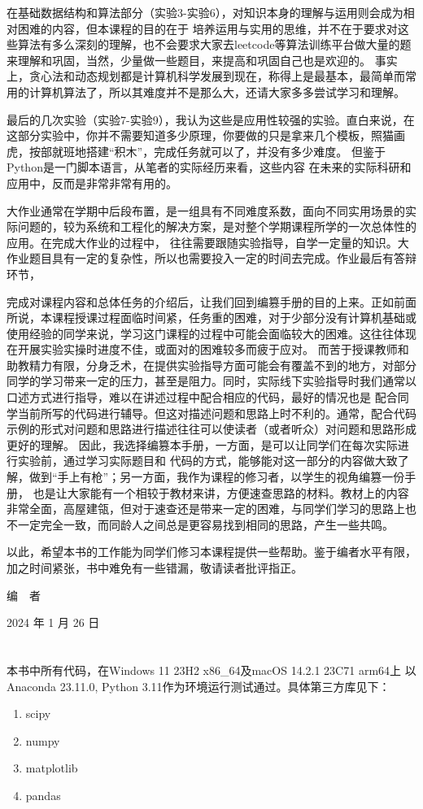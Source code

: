 \documentclass[UTF8,a5paper,10pt]{ctexbook}
\makeatletter
\renewcommand\tableofcontents{%
    \thispagestyle{empty}
    \section*{\contentsname
        \@mkboth{%
           \MakeUppercase\contentsname}{\MakeUppercase\contentsname}}%
    \@starttoc{toc}%
    \newpage
    }
\makeatother
\begin{document}
在基础数据结构和算法部分（实验3-实验6），对知识本身的理解与运用则会成为相对困难的内容，但本课程的目的在于
培养运用与实用的思维，并不在于要求对这些算法有多么深刻的理解，也不会要求大家去leetcode等算法训练平台做大量的题来理解和巩固，当然，少量做一些题目，来提高和巩固自己也是欢迎的。
事实上，贪心法和动态规划都是计算机科学发展到现在，称得上是最基本，最简单而常用的计算机算法了，所以其难度并不是那么大，还请大家多多尝试学习和理解。

最后的几次实验（实验7-实验9），我认为这些是应用性较强的实验。直白来说，在这部分实验中，你并不需要知道多少原理，你要做的只是拿来几个模板，照猫画虎，按部就班地搭建“积木”，完成任务就可以了，并没有多少难度。
但鉴于Python是一门脚本语言，从笔者的实际经历来看，这些内容
在未来的实际科研和应用中，反而是非常非常有用的。

大作业通常在学期中后段布置，是一组具有不同难度系数，面向不同实用场景的实际问题的，较为系统和工程化的解决方案，是对整个学期课程所学的一次总体性的应用。在完成大作业的过程中，
往往需要跟随实验指导，自学一定量的知识。大作业题目具有一定的复杂性，所以也需要投入一定的时间去完成。作业最后有答辩环节，

完成对课程内容和总体任务的介绍后，让我们回到编篡手册的目的上来。正如前面所说，本课程授课过程面临时间紧，任务重的困难，对于少部分没有计算机基础或使用经验的同学来说，学习这门课程的过程中可能会面临较大的困难。这往往体现在开展实验实操时进度不佳，或面对的困难较多而疲于应对。
而苦于授课教师和助教精力有限，分身乏术，在提供实验指导方面可能会有覆盖不到的地方，对部分同学的学习带来一定的压力，甚至是阻力。同时，实际线下实验指导时我们通常以口述方式进行指导，难以在讲述过程中配合相应的代码，最好的情况也是
配合同学当前所写的代码进行辅导。但这对描述问题和思路上时不利的。通常，配合代码示例的形式对问题和思路进行描述往往可以使读者（或者听众）对问题和思路形成更好的理解。
因此，我选择编篡本手册，一方面，是可以让同学们在每次实际进行实验前，通过学习实际题目和
代码的方式，能够能对这一部分的内容做大致了解，做到“手上有枪”；另一方面，我作为课程的修习者，以学生的视角编篡一份手册，
也是让大家能有一个相较于教材来讲，方便速查思路的材料。教材上的内容非常全面，高屋建瓴，但对于速查还是带来一定的困难，与同学们学习的思路上也不一定完全一致，而同龄人之间总是更容易找到相同的思路，产生一些共鸣。

以此，希望本书的工作能为同学们修习本课程提供一些帮助。鉴于编者水平有限，加之时间紧张，书中难免有一些错漏，敬请读者批评指正。

\hfill

\hfill 编~~者~~~~~~~

\hfill 2024 年 1 月 26 日
\newpage
\tableofcontents
\thispagestyle{empty}
本书中所有代码，在Windows 11 23H2 x86\_64及macOS 14.2.1 23C71 arm64上
以Anaconda 23.11.0, Python 3.11作为环境运行测试通过。具体第三方库见下：
\begin{enumerate}
    \item scipy
    \item numpy
    \item matplotlib
    \item pandas
\end{enumerate}
\newpage
{}


\end{document}
